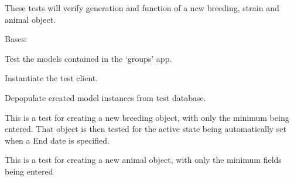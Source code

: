 \documentclass[letterpaper,10pt,english]{sphinxmanual}
\begin{document}
\begin{fulllineitems}
These tests will verify generation and function of a new breeding, strain and animal object.

\begin{fulllineitems}
\label{api:animal.tests.BreedingModelTests}
Bases: 

Test the models contained in the `groups' app.

\begin{fulllineitems}
\label{api:animal.tests.BreedingModelTests.setUp}
Instantiate the test client.

\end{fulllineitems}


\begin{fulllineitems}
\label{api:animal.tests.BreedingModelTests.tearDown}
Depopulate created model instances from test database.

\end{fulllineitems}


\begin{fulllineitems}
\label{api:animal.tests.BreedingModelTests.test_autoset_active_state}
This is a test for creating a new breeding object, with only the minimum being entered.  That object is then tested for the active state being automatically set when a End date is specified.

\end{fulllineitems}


\begin{fulllineitems}
\label{api:animal.tests.BreedingModelTests.test_create_animal_minimal}
This is a test for creating a new animal object, with only the minimum fields being entered

\end{fulllineitems}


\end{fulllineitems}
\end{fulllineitems}
\end{document}
